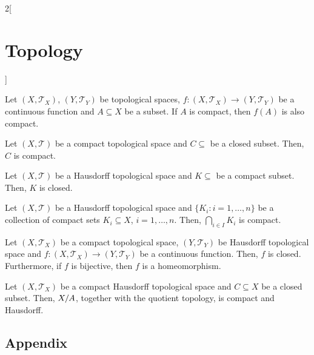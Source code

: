 \documentclass[../../../main.tex]{subfiles}
\begin{document}
\begin{multicols}{2}[\section{Topology}]
\begin{prop}
    Let $(X,\mathcal{T}_X)$, $(Y,\mathcal{T}_Y)$ be topological spaces, $f:(X,\mathcal{T}_X)\rightarrow(Y,\mathcal{T}_Y)$ be a continuous function and $A\subseteq X$ be a subset. If $A$ is compact, then $f(A)$ is also compact.
  \end{prop}
  \begin{prop}
    Let $(X,\mathcal{T})$ be a compact topological space and $C\subseteq $ be a closed subset. Then, $C$ is compact.
  \end{prop}
  \begin{prop}
    Let $(X,\mathcal{T})$ be a Hausdorff topological space and $K\subseteq $ be a compact subset. Then, $K$ is closed.
  \end{prop}
  \begin{corollary}
    Let $(X,\mathcal{T})$ be a Hausdorff topological space and $\{K_i:i=1,\ldots,n\}$ be a collection of compact sets $K_i\subseteq X$, $i=1,\ldots,n$. Then, $\bigcap_{i\in I}K_i$ is compact.
  \end{corollary}
  \begin{corollary}
    Let $(X,\mathcal{T}_X)$ be a compact topological space, $(Y,\mathcal{T}_Y)$ be Hausdorff topological space and $f:(X,\mathcal{T}_X)\rightarrow(Y,\mathcal{T}_Y)$ be a continuous function. Then, $f$ is closed. Furthermore, if $f$ is bijective, then $f$ is a homeomorphism.
  \end{corollary}
  \begin{prop}
    Let $(X,\mathcal{T}_X)$ be a compact Hausdorff topological space and $C\subseteq X$ be a closed subset. Then, $\quot{X}{A}$, together with the quotient topology, is compact and Hausdorff.
  \end{prop}










  \subsection{Appendix}

\end{multicols}
\end{document}
